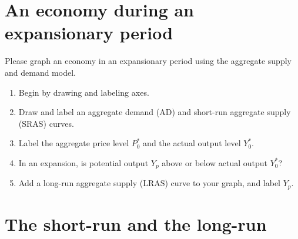 \documentclass{assignment}
\begin{document}
\vfill

\begin{center}
\end{center}

\clearpage

\section{An economy during an expansionary period}\label{sec:expansion}

Please graph an economy in an expansionary period using the aggregate supply and demand model.

\begin{enumerate}
\item Begin by drawing and labeling axes.
\item Draw and label an aggregate demand (AD) and short-run aggregate supply (SRAS) curves.
\item Label the aggregate price level $P^*_0$ and the actual output level $Y^*_0$.
\item In an expansion, is potential output $Y_p$ above or below actual output $Y^*_0$? \hfill \underline{\hspace{1.5in}}
\item Add a long-run aggregate supply (LRAS) curve to your graph, and label $Y_p$.
\end{enumerate}

\vfill

\begin{center}
\end{center}

\section{The short-run and the long-run}
\end{document}
